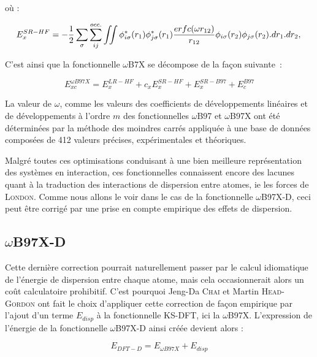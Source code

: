 {{\noindent où :

\begin{equation}
E_{x}^{SR-HF} = -\frac{1}{2} \sum_{\sigma} \sum_{ij}^{occ.} \iint \phi_{i \sigma}^{*}(r_{1}) \phi_{j \sigma}^{*}(r_{1}) \frac{erfc(\omega r_{12})}{r_{12}} \phi_{i \sigma}(r_{2}) \phi_{j \sigma}(r_{2}).dr_{1}.dr_{2}, \\
\end{equation}

C'est ainsi que la fonctionnelle $\omega$B7X\cite{chai2008long} se décompose de la façon suivante~:

\begin{equation}
E_{xc}^{\omega B97X} = E_{x}^{LR-HF} + c_{x}E_{x}^{SR-HF} + E_{x}^{SR-B97} + E_{c}^{B97}
\end{equation}

La valeur de $\omega$, comme les valeurs des coefficients de développements linéaires et de développements à l'ordre $m$ des fonctionnelles $\omega$B97 et $\omega$B97X ont été déterminées par la méthode des moindres carrés appliquée à une base de données composées de 412 valeurs précises, expérimentales et théoriques.

Malgré toutes ces optimisations conduisant à une bien meilleure représentation des systèmes en interaction, ces fonctionnelles connaissent encore des lacunes quant à la traduction des interactions de dispersion entre atomes, ie les forces de \textsc{London}. Comme nous allons le voir dans le cas de la fonctionnelle $\omega$B97X-D, ceci peut être corrigé par une prise en compte empirique des effets de dispersion.

\subsection{$\omega$B97X-D}

Cette dernière correction pourrait naturellement passer par le calcul idiomatique de l'énergie de dispersion entre chaque atome, mais cela occasionnerait alors un coût calculatoire prohibitif. C'est pourquoi Jeng-Da \textsc{Chai} et Martin \textsc{Head-Gordon} ont fait le choix d'appliquer cette correction de façon empirique par l'ajout d'un terme $E_{disp}$ à la fonctionnelle KS-DFT, ici la $\omega$B97X. L'expression de l'énergie de la fonctionnelle $\omega$B97X-D \cite{chai2008long} ainsi créée devient alors :

\begin{equation}
E_{DFT-D}=E_{\omega B97X}+E_{disp}
\end{equation}

}}
